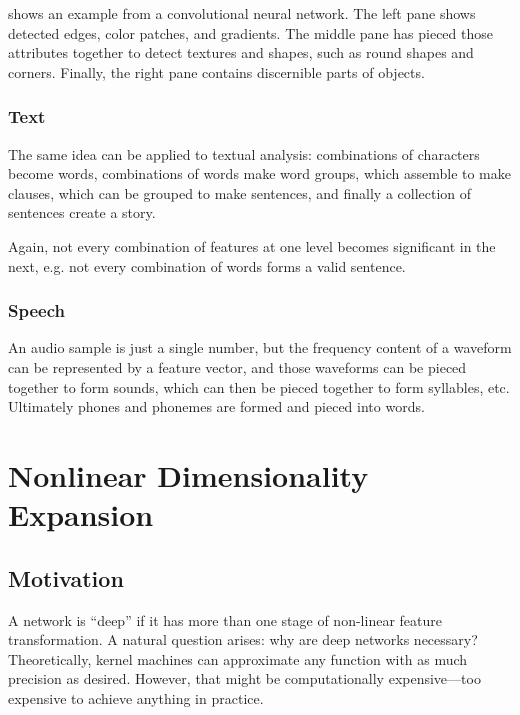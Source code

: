  shows an example from a convolutional neural network.
The left pane shows detected edges, color patches, and gradients.
The middle pane has pieced those attributes together to detect textures and shapes, such as round shapes and corners.
Finally, the right pane contains discernible parts of objects.

\subsection{Text}

The same idea can be applied to textual analysis: combinations of characters become words, combinations of words make word groups, which assemble to make clauses, which can be grouped to make sentences, and finally a collection of sentences create a story.

Again, not every combination of features at one level becomes significant in the next, e.g. not every combination of words forms a valid sentence.

\subsection{Speech}

An audio sample is just a single number, but the frequency content of a waveform can be represented by a feature vector, and those waveforms can be pieced together to form sounds, which can then be pieced together to form syllables, etc.
Ultimately phones and phonemes are formed and pieced into words.

\chapter{Nonlinear Dimensionality Expansion}

\section{Motivation}

A network is ``deep'' if it has more than one stage of non-linear feature transformation. A natural question arises: why are deep networks necessary?
Theoretically, kernel machines can approximate any function with as much precision as desired.
However, that might be computationally expensive---too expensive to achieve anything in practice.

